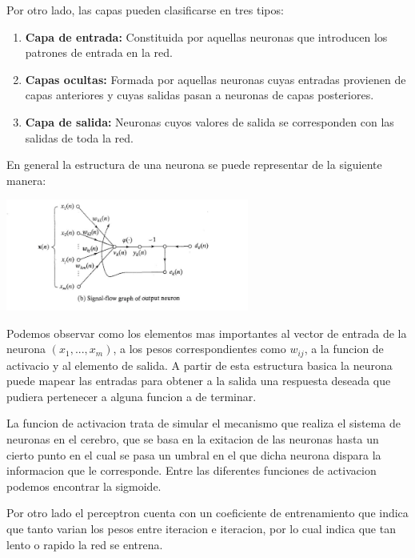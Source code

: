 Por otro lado, las capas pueden clasificarse en tres tipos:

\begin{enumerate}
\item \textbf{Capa de entrada:} Constituida por aquellas neuronas que introducen los patrones de entrada en la red. 
\item \textbf{Capas ocultas:} Formada por aquellas neuronas cuyas entradas provienen de capas anteriores y cuyas salidas pasan a neuronas de capas posteriores.
\item \textbf{Capa de salida:} Neuronas cuyos valores de salida se corresponden con las salidas de toda la red.
\end{enumerate}


En general la estructura de una neurona se puede representar de la siguiente manera:

\begin{center}
\includegraphics[width=0.6\textwidth]{img/neurona}
\end{center}

Podemos observar como los elementos mas importantes al vector de entrada de la neurona $(x_1,...,x_m)$, a los pesos correspondientes como $w_{ij}$, a la funcion de activacio y al elemento de salida. A partir de esta estructura basica la neurona puede mapear las entradas para obtener a la salida una respuesta deseada que pudiera pertenecer a alguna funcion a de terminar.


La funcion de activacion trata de simular el mecanismo que realiza el sistema de neuronas en el cerebro, que se basa en la exitacion de las neuronas hasta un cierto punto en el cual se pasa un umbral en el que dicha neurona dispara la informacion que le corresponde. Entre las diferentes funciones de activacion podemos encontrar la sigmoide.


Por otro lado el perceptron cuenta con un coeficiente de entrenamiento que indica que tanto varian los pesos entre iteracion e iteracion, por lo cual indica que tan lento o rapido la red se entrena.